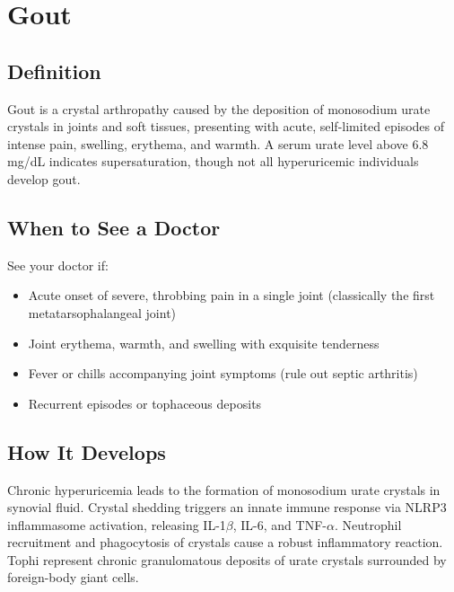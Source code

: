 \chapter{Gout}

\section*{Definition}
Gout is a crystal arthropathy caused by the deposition of monosodium urate crystals in joints and soft tissues, presenting with acute, self-limited episodes of intense pain, swelling, erythema, and warmth. A serum urate level above 6.8 mg/dL indicates supersaturation, though not all hyperuricemic individuals develop gout.

\section*{When to See a Doctor}
See your doctor if:
\begin{itemize}
  \item Acute onset of severe, throbbing pain in a single joint (classically the first metatarsophalangeal joint)
  \item Joint erythema, warmth, and swelling with exquisite tenderness
  \item Fever or chills accompanying joint symptoms (rule out septic arthritis)
  \item Recurrent episodes or tophaceous deposits
\end{itemize}

\section*{How It Develops}
Chronic hyperuricemia leads to the formation of monosodium urate crystals in synovial fluid. Crystal shedding triggers an innate immune response via NLRP3 inflammasome activation, releasing IL-1$\beta$, IL-6, and TNF-$\alpha$. Neutrophil recruitment and phagocytosis of crystals cause a robust inflammatory reaction. Tophi represent chronic granulomatous deposits of urate crystals surrounded by foreign-body giant cells.

